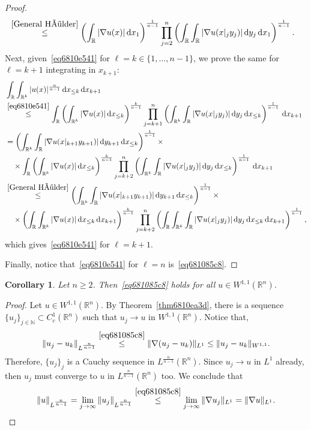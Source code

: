 \documentclass[a4paper,9pt]{amsart}
\newcommand{\N}{\mathbb{N}}	%
\newcommand{\R}{\mathbb{R}}	%
\newcommand{\did}{\,\mathrm{d}}	%
\newcommand{\grad}{\nabla}
\theoremstyle{plain}
\newtheorem{corollary}[proposition]{Corollary}
\theoremstyle{definition}
\theoremstyle{remark}
\begin{document}
\begin{proof}
\begin{align}
		&\overset{\eqref{General Hölder}}\le \left( \int_{\R} |\grad u(x)| \did x_1 \right)^{\frac1{n-1}}
			\prod_{j=2}^n \left( \int_\R  \int_{\R} |\grad u(x|_jy_j)| \did y_j  \did x_1 \right)^{\frac1{n-1}} .
	\end{align}
	Next, given~\eqref{eq6810e541} for $\ell = k\in\{1,\dots,n-1\}$, we prove the same for $\ell = k+1$ integrating in $x_{k+1}$:
	\begin{align*}
	 	&\int_\R \int_{\R^k} |u(x)|^{\frac{n}{n-1}}  \did x_{\le k} \did x_{k+1} \\
		&\overset{\eqref{eq6810e541}}\le \int_\R \left( \int_{\R^k} |\grad u(x)| \did x_{\le k} \right)^{\frac{k}{n-1}} 
		 \prod_{j=k+1}^n \left( \int_{\R^k} \int_\R |\grad u(x|_jy_j)| \did y_j \did x_{\le k}\right)^{\frac{1}{n-1}} \did x_{k+1} \\
		&= \left( \int_{\R^k} \int_\R |\grad u(x|_{k+1}y_{k+1})| \did y_{k+1} \did x_{\le k}\right)^{\frac{1}{n-1}} \times\\
		&\quad\times \int_\R \left( \int_{\R^k} |\grad u(x)| \did x_{\le k} \right)^{\frac{k}{n-1}} 
		 \prod_{j=k+2}^n \left( \int_{\R^k} \int_\R |\grad u(x|_jy_j)| \did y_j \did x_{\le k}\right)^{\frac{1}{n-1}} \did x_{k+1} \\
		 &\overset{\eqref{General Hölder}}\le\left( \int_{\R^k} \int_\R |\grad u(x|_{k+1}y_{k+1})| \did y_{k+1} \did x_{\le k}\right)^{\frac{1}{n-1}} \times\\
		&\quad\times \left( \int_\R\int_{\R^k} |\grad u(x)| \did x_{\le k} \did x_{k+1}\right)^{\frac{k}{n-1}} 
		 \prod_{j=k+2}^n \left( \int_\R\int_{\R^k} \int_\R |\grad u(x|_jy_j)| \did y_j \did x_{\le k} \did x_{k+1}\right)^{\frac{1}{n-1}}  ,
	\end{align*}
	which gives~\eqref{eq6810e541} for $\ell = k+1$. 
	
	Finally, notice that~\eqref{eq6810e541} for $\ell=n$ is~\eqref{eq681085c8}.
\end{proof}

\begin{corollary}\label{cor6810ee47}
	Let $n\ge 2$.
	Then~\eqref{eq681085c8} holds for all $u\in W^{1,1}(\R^n)$.
\end{corollary}
\begin{proof}
	Let $u\in W^{1,1}(\R^n)$.
	By Theorem~\ref{thm6810ea3d}, there is a sequence $\{u_j\}_{j\in\N}\subset C^1_c(\R^n)$ such that $u_j\to u$ in $W^{1,1}(\R^n)$.
	Notice that, 
	\begin{equation}
		\|u_j-u_k\|_{L^{\frac{n}{n-1}}} 
		\overset{\eqref{eq681085c8}}\le \|\grad(u_j-u_k)\|_{L^1}
		\le \|u_j-u_k\|_{W^{1,1}} .
	\end{equation}
	Therefore, $\{u_j\}_j$ is a Cauchy sequence in $L^{\frac{n}{n-1}}(\R^n)$.
	Since $u_j\to u$ in $L^1$ already, then $u_j$ must converge to $u$ in $L^{\frac{n}{n-1}}(\R^n)$ too.
	We conclude that
	\begin{equation}
		\|u\|_{L^{\frac{n}{n-1}}} 
		= \lim_{j\to\infty} \|u_j\|_{L^{\frac{n}{n-1}}}
		\overset{\eqref{eq681085c8}}\le \lim_{j\to\infty} \|\grad u_j\|_{L^1}
		= \|\grad u\|_{L^1} .
	\end{equation}
\end{proof}
\end{document}
